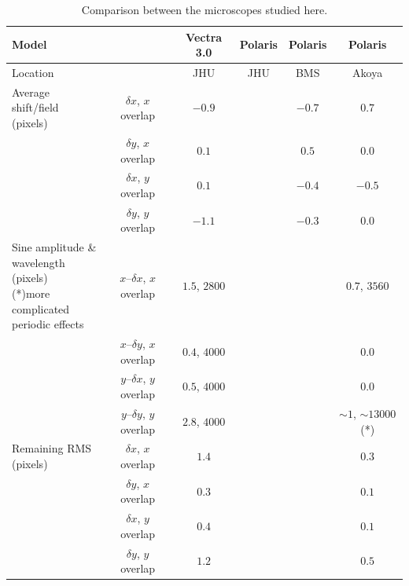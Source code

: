 \documentclass{article}
\begin{document}
\begin{table}[ht]
	\centering
	\begin{tabular}{|l|c|c|c|c|c|}
	\hline
	\multicolumn{2}{|l|}{Model} & Vectra 3.0 & Polaris & Polaris & Polaris \\\hline
	\multicolumn{2}{|l|}{Location} & JHU & JHU & BMS & Akoya \\\hline
	\multirowcell{3}[0pt][l]{Average shift/field \\ (pixels)}
	& $\delta x$, $x$ overlap & $-0.9$ & & $-0.7$ & $0.7$ \\\cline{2-6}
	& $\delta y$, $x$ overlap & $0.1$ & & $0.5$ & $0.0$ \\\cline{2-6}
	& $\delta x$, $y$ overlap & $0.1$ & & $-0.4$ & $-0.5$ \\\cline{2-6}
	& $\delta y$, $y$ overlap & $-1.1$ & & $-0.3$ & $0.0$ \\\hline
	\multirowcell{4}[0pt][l]{Sine amplitude \& \\wavelength (pixels)\\ (*)more complicated\\periodic effects}
	& $x$--$\delta x$, $x$ overlap & $1.5$, $2800$ & & & $0.7$, $3560$ \\\cline{2-6}
	& $x$--$\delta y$, $x$ overlap & $0.4$, $4000$ & & & $0.0$ \\\cline{2-6}
	& $y$--$\delta x$, $y$ overlap & $0.5$, $4000$ & & & $0.0$ \\\cline{2-6}
	& $y$--$\delta y$, $y$ overlap & $2.8$, $4000$ & & & $\sim1$, $\sim13000$(*) \\\hline
	\multirowcell{4}[0pt][l]{Remaining RMS\\(pixels)}
	& $\delta x$, $x$ overlap & $1.4$ & & & $0.3$ \\\cline{2-6}
	& $\delta y$, $x$ overlap & $0.3$ & & & $0.1$ \\\cline{2-6}
	& $\delta x$, $y$ overlap & $0.4$ & & & $0.1$ \\\cline{2-6}
	& $\delta y$, $y$ overlap & $1.2$ & & & $0.5$ \\\hline
	\end{tabular}
	\caption{Comparison between the microscopes studied here.}
	\label{table:microscopes}
\end{table}
\end{document}
